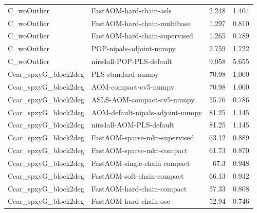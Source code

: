 \begin{landscape}
\begin{longtable}{L{8.0cm}L{9.5cm}rr}
C\_\allowbreak{}woOutlier & FastAOM-\allowbreak{}hard-\allowbreak{}chain-\allowbreak{}asls & 2.248 & 1.404 \\
C\_\allowbreak{}woOutlier & FastAOM-\allowbreak{}hard-\allowbreak{}chain-\allowbreak{}multibase & 1.297 & 0.810 \\
C\_\allowbreak{}woOutlier & FastAOM-\allowbreak{}hard-\allowbreak{}chain-\allowbreak{}supervised & 1.265 & 0.789 \\
C\_\allowbreak{}woOutlier & POP-\allowbreak{}nipals-\allowbreak{}adjoint-\allowbreak{}numpy & 2.759 & 1.722 \\
C\_\allowbreak{}woOutlier & nirs4all-\allowbreak{}POP-\allowbreak{}PLS-\allowbreak{}default & 9.058 & 5.655 \\
Ccar\_\allowbreak{}spxyG\_\allowbreak{}block2deg & PLS-\allowbreak{}standard-\allowbreak{}numpy & 70.98 & 1.000 \\
Ccar\_\allowbreak{}spxyG\_\allowbreak{}block2deg & AOM-\allowbreak{}compact-\allowbreak{}cv5-\allowbreak{}numpy & 70.98 & 1.000 \\
Ccar\_\allowbreak{}spxyG\_\allowbreak{}block2deg & ASLS-\allowbreak{}AOM-\allowbreak{}compact-\allowbreak{}cv5-\allowbreak{}numpy & 55.76 & 0.786 \\
Ccar\_\allowbreak{}spxyG\_\allowbreak{}block2deg & AOM-\allowbreak{}default-\allowbreak{}nipals-\allowbreak{}adjoint-\allowbreak{}numpy & 81.25 & 1.145 \\
Ccar\_\allowbreak{}spxyG\_\allowbreak{}block2deg & nirs4all-\allowbreak{}AOM-\allowbreak{}PLS-\allowbreak{}default & 81.25 & 1.145 \\
Ccar\_\allowbreak{}spxyG\_\allowbreak{}block2deg & FastAOM-\allowbreak{}sparse-\allowbreak{}mkr-\allowbreak{}supervised & 63.12 & 0.889 \\
Ccar\_\allowbreak{}spxyG\_\allowbreak{}block2deg & FastAOM-\allowbreak{}sparse-\allowbreak{}mkr-\allowbreak{}compact & 61.73 & 0.870 \\
Ccar\_\allowbreak{}spxyG\_\allowbreak{}block2deg & FastAOM-\allowbreak{}single-\allowbreak{}chain-\allowbreak{}compact & 67.3 & 0.948 \\
Ccar\_\allowbreak{}spxyG\_\allowbreak{}block2deg & FastAOM-\allowbreak{}soft-\allowbreak{}chain-\allowbreak{}compact & 66.13 & 0.932 \\
Ccar\_\allowbreak{}spxyG\_\allowbreak{}block2deg & FastAOM-\allowbreak{}hard-\allowbreak{}chain-\allowbreak{}compact & 57.33 & 0.808 \\
Ccar\_\allowbreak{}spxyG\_\allowbreak{}block2deg & FastAOM-\allowbreak{}hard-\allowbreak{}chain-\allowbreak{}osc & 52.94 & 0.746 \\

\end{longtable}
\end{landscape}
